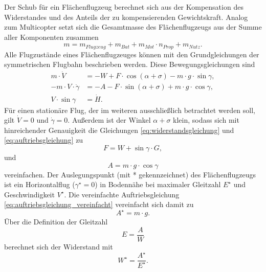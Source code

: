 Der Schub für ein Flächenflugzeug berechnet sich aus der Kompensation des Widerstandes und des Anteils der zu kompensierenden Gewichtskraft. Analog zum Multicopter setzt sich die Gesamtmasse des Flächenflugzeugs aus der Summe aller Komponenten zusammen
\begin{equation}
	m = m_{Flugzeug}+m_{Bat}+m_{Mot}\cdot n_{Prop}+m_{Nutz}.
\end{equation}
Alle Flugzustände eines Flächenflugzeuges können mit den Grundgleichungen der symmetrischen Flugbahn beschrieben werden. Diese Bewegungsgleichungen \cite[S.77]{Bruning.1986} sind
\begin{align}
	m\cdot \dot{V} &= -W + F\cdot\cos(\alpha+\sigma)-m\cdot g\cdot\sin\gamma , \label{eq:widerstandsgleichung} \\ 
	-m\cdot V\cdot\dot{\gamma} &= -A - F\cdot\sin(\alpha+\sigma)+m\cdot g\cdot\cos\gamma , \label{eq:auftriebsgleichung} \\ 
	V\cdot\sin\gamma &= \dot{H}. \label{eq:steiggleichung}
\end{align}	
Für einen stationäre Flug, der im weiteren ausschließlich betrachtet werden soll, gilt \ensuremath{\dot{V} = 0} und \ensuremath{\dot{\gamma} = 0}. Außerdem ist der Winkel \ensuremath{\alpha + \sigma} klein, sodass sich mit hinreichender Genauigkeit die Gleichungen \ref{eq:widerstandsgleichung} und \ref{eq:auftriebsgleichung} zu
\begin{equation}
	F = W + \sin\gamma\cdot G, 
	\label{eq:widerstandsgleichung_vereinfacht}
\end{equation}
und
\begin{equation}
	A = m\cdot g\cdot\cos\gamma 
	\label{eq:auftriebsgleichung_vereinfacht}
\end{equation} 
vereinfachen. Der Auslegungspunkt (mit * gekennzeichnet) des Flächenflugzeugs ist ein Horizontalflug (\ensuremath{\gamma^\star = 0}) in Bodennähe bei maximaler Gleitzahl \ensuremath{E^\star} und Geschwindigkeit \ensuremath{V^\star}. Die vereinfachte Auftriebsgleichung \ref{eq:auftriebsgleichung_vereinfacht} vereinfacht sich damit zu
\begin{equation}
	A^\star = m\cdot g .
\end{equation}
Über die Definition der Gleitzahl \cite[S.49]{Bruning.1986}
\begin{equation}
	E = \frac{A}{W}
\end{equation}
berechnet sich der Widerstand mit
\begin{equation}
	W^\star = \frac{A^\star}{E^\star} .
\end{equation}
